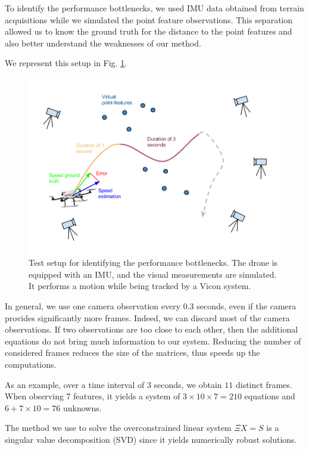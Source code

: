 \documentclass[letterpaper, 10 pt, conference]{ieeeconf}  %
\begin{document}
To identify the performance bottlenecks, we used IMU data obtained from terrain acquisitions
while we simulated the point feature observations.
This separation allowed us to know the ground truth for the distance to the point features
and also better understand the weaknesses of our method.

We represent this setup in Fig. \ref{fig:testsetup}.

\begin{figure}[h!]
  \centering
  \includegraphics[width=\columnwidth]{images/setupTestDroneError.png}
  \caption{Test setup for identifying the performance bottlenecks.
    The drone is equipped with an IMU, and the visual measurements are simulated.
    It performs a motion while being tracked by a Vicon system.\label{fig:testsetup}}
\end{figure}

In general, we use one camera observation every 0.3 seconds, even if the camera provides significantly more frames.
Indeed, we can discard most of the camera observations.
If two observations are too close to each other, then the additional equations do not bring much information to our system.
Reducing the number of considered frames reduces the size of the matrices, thus speeds up the computations.

As an example, over a time interval of 3 seconds, we obtain $11$ distinct frames.
When observing 7 features, it yields a system of $3\times 10\times 7 = 210$ equations and $6+7\times 10=76$ unknowns.

The method we use to solve the overconstrained linear system $\Xi X = S$ is a singular value decomposition (SVD) since it yields numerically robust solutions.
\end{document}
